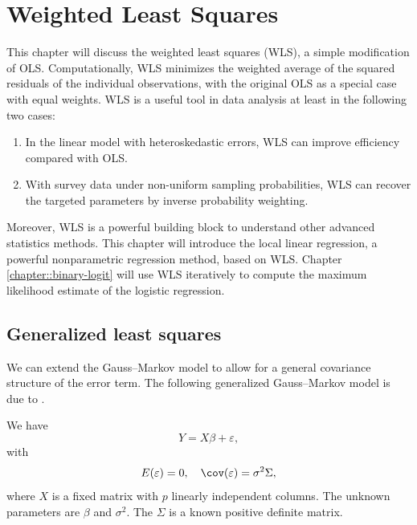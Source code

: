  
\chapter{Weighted Least Squares}\label{chapter::WLS}


This chapter will discuss the weighted least squares (WLS),  a simple modification of OLS. Computationally, WLS minimizes the weighted average of the squared residuals of the individual observations, with the original OLS as a special case with equal weights. WLS is a useful tool in data analysis at least in the following two cases:
\begin{enumerate}[label=(C\arabic*), ref=C\arabic*]
\item
In the linear model with heteroskedastic errors, WLS can improve efficiency compared with OLS. 

\item
With survey data under non-uniform sampling probabilities, WLS can recover the targeted parameters by inverse probability weighting. 
\end{enumerate} 

Moreover, WLS is a powerful building block to understand other advanced statistics methods. This chapter will introduce the local linear regression, a powerful nonparametric regression method, based on WLS. Chapter \ref{chapter::binary-logit} will use WLS iteratively to compute the maximum likelihood estimate of the logistic regression. 



 
\section{Generalized least squares}\label{section::GLS}

We can extend the Gauss--Markov model to allow for a general covariance structure of the error term. The following generalized Gauss--Markov model is due to \citet{aitkin1936least}.


\begin{assumption}
\label{assume::g-gaussmarkov}
We have 
$$
Y=X\beta+\varepsilon,
$$ 
with
$$
E(\varepsilon) = 0,\quad \cov(\varepsilon) = \sigma^2 \Sigma, 
$$
where $X$ is a fixed matrix with $p$ linearly independent columns.
The unknown parameters are  $\beta $ and $ \sigma^{2}$.
The $\Sigma$ is a known positive definite matrix.
\end{assumption}






